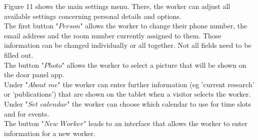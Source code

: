 \documentclass[article,colorback,accentcolor=tud4c, 11pt]{tudreport}
\begin{document}
Figure 11 shows the main settings menu. There, the worker can adjust all available settings concerning personal details and options.\\

The first button "$Person$" allows the worker to change their phone number, the email address and the room number currently assigned to them. Those information can be changed individually or all together. Not all fields need to be filled out.\\

The button "$Photo$" allows the worker to select a picture that will be shown on the door panel app.\\
 
Under "$About$ $me$" the worker can enter further information (eg 'current research' or 'publications') that are shown on the tablet when a visitor selects the worker.\\ 


Under "$Set$ $calendar$" the worker can choose which calendar to use for time slots and for events.\\

The button "$New$ $Worker$" leads to an interface that allows the worker to enter information for a new worker.

	\listoffigures{}
\end{document}
